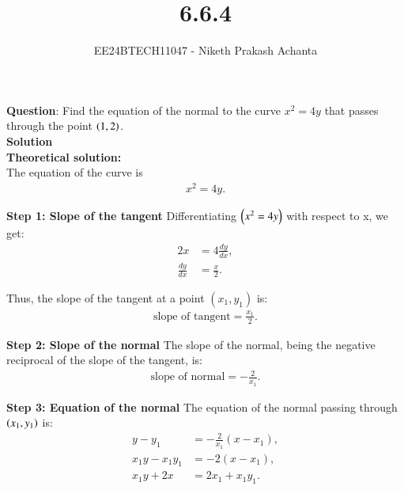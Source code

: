 \documentclass[journal]{IEEEtran}
\begin{document}

\vspace{3cm}

\title{6.6.4}
\author{EE24BTECH11047 - Niketh Prakash Achanta}
 \maketitle
{\let\newpage\relax\maketitle}

\renewcommand{\thefigure}{\theenumi}
\renewcommand{\thetable}{\theenumi}
\setlength{\intextsep}{10pt} %


\renewcommand{\thetable}{\theenumi}

\textbf{Question}: Find the equation of the normal to the curve $x^2=4y$ that passes through the point $\left(1,2\right)$.\\
\textbf{Solution}
\\
\textbf{Theoretical solution:}\\

The equation of the curve is 
\begin{align}
x^2 = 4y.
\end{align}

\textbf{Step 1: Slope of the tangent}  
Differentiating $\left(x^2 = 4y\right)$ with respect to x, we get:
\begin{align}
    2x &= 4 \frac{dy}{dx}, \\
    \frac{dy}{dx} &= \frac{x}{2}.
\end{align}

Thus, the slope of the tangent at a point \((x_1, y_1)\) is:
\begin{align}
\text{slope of tangent} = \frac{x_1}{2}.
\end{align}

\textbf{Step 2: Slope of the normal}  
The slope of the normal, being the negative reciprocal of the slope of the tangent, is:
\begin{align}
\text{slope of normal} = -\frac{2}{x_1}.
\end{align}

\textbf{Step 3: Equation of the normal}  
The equation of the normal passing through $\left(x_1, y_1\right)$ is:
\begin{align}
    y - y_1 &= -\frac{2}{x_1}(x - x_1), \\
    x_1y - x_1y_1 &= -2(x - x_1), \\
    x_1y + 2x &= 2x_1 + x_1y_1.
\end{align}
\end{document}
